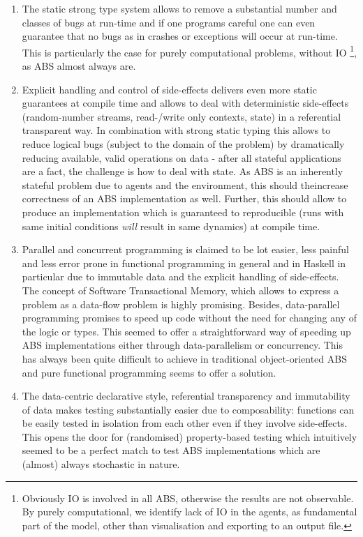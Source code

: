 \begin{enumerate}
	\item The static strong type system allows to remove a substantial number and classes of bugs at run-time and if one programs careful one can even guarantee that no bugs as in crashes or exceptions will occur at run-time. This is particularly the case for purely computational problems, without IO \footnote{Obviously IO is involved in all ABS, otherwise the results are not observable. By purely computational, we identify lack of IO in the agents, as fundamental part of the model, other than visualisation and exporting to an output file.}, as ABS almost always are. 
	
	\item Explicit handling and control of side-effects delivers even more static guarantees at compile time and allows to deal with deterministic side-effects (random-number streams, read-/write only contexts, state) in a referential transparent way. In combination with strong static typing this allows to reduce logical bugs (subject to the domain of the problem) by dramatically reducing available, valid operations on data - after all stateful applications are a fact, the challenge is how to deal with state. As ABS is an inherently stateful problem due to agents and the environment, this should  theincrease correctness of an ABS implementation as well. Further, this should allow to produce an implementation which is guaranteed to reproducible (runs with same initial conditions \textit{will} result in same dynamics) at compile time.
	
	\item Parallel and concurrent programming is claimed to be lot easier, less painful and less error prone in functional programming in general and in Haskell in particular due to immutable data and the explicit handling of side-effects. The concept of Software Transactional Memory, which allows to express a problem as a data-flow problem is highly promising. Besides, data-parallel programming promises to speed up code without the need for changing any of the logic or types. This seemed to offer a straightforward way of speeding up ABS implementations either through data-parallelism or concurrency. This has always been quite difficult to achieve in traditional object-oriented ABS and pure functional programming seems to offer a solution.
	
	\item The data-centric declarative style, referential transparency and immutability of data makes testing substantially easier due to composability: functions can be easily tested in isolation from each other even if they involve side-effects. This opens the door for (randomised) property-based testing which intuitively seemed to be a perfect match to test ABS implementations which are (almost) always stochastic in nature.
\end{enumerate}

